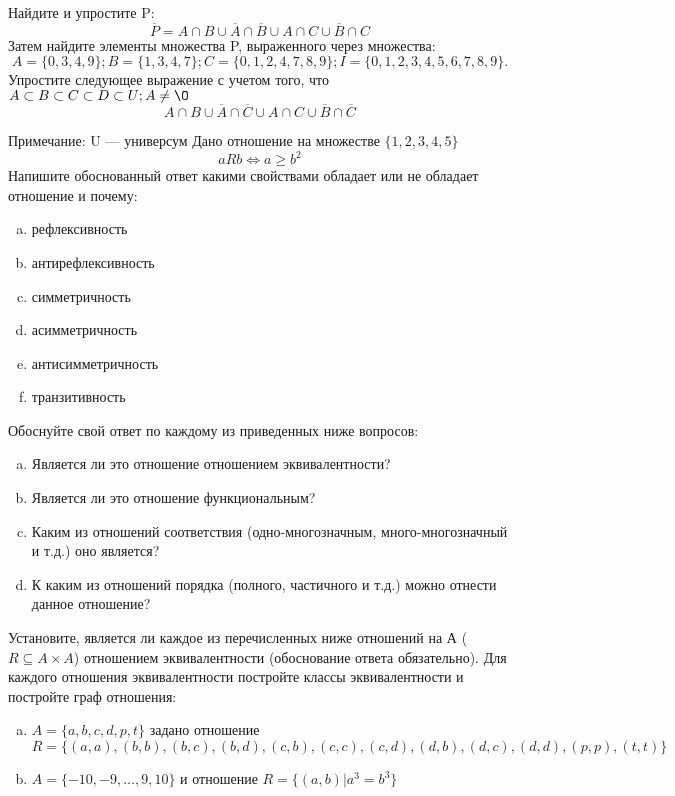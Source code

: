 \documentclass[10pt]{exam}
\begin{document}
\begin{questions}
\question
Найдите и упростите P:
\begin{equation*}
\overline{P} = A \cap B \cup \overline{A} \cap \overline{B} \cup A \cap C \cup \overline{B} \cap C
\end{equation*}
Затем найдите элементы множества P, выраженного через множества:
\begin{equation*}
A = \{0, 3, 4, 9\}; 
B = \{1, 3, 4, 7\};
C = \{0, 1, 2, 4, 7, 8, 9\};
I = \{0, 1, 2, 3, 4, 5, 6, 7, 8, 9\}.
\end{equation*}\question
Упростите следующее выражение с учетом того, что $A\subset B \subset C \subset D \subset U; A \neq \O$
\begin{equation*}
A \cap B \cup \overline{A} \cap \overline{C} \cup A \cap C \cup \overline{B} \cap \overline{C}
\end{equation*}

Примечание: U — универсум\question
Дано отношение на множестве $\{1, 2, 3, 4, 5\}$ 
\begin{equation*}
aRb \iff a \geq b^2
\end{equation*}
Напишите обоснованный ответ какими свойствами обладает или не обладает отношение и почему:   
\begin{enumerate} [a)]\setcounter{enumi}{0}
\item рефлексивность
\item антирефлексивность
\item симметричность
\item асимметричность
\item антисимметричность
\item транзитивность
\end{enumerate}

Обоснуйте свой ответ по каждому из приведенных ниже вопросов:
\begin{enumerate} [a)]\setcounter{enumi}{0}
    \item Является ли это отношение отношением эквивалентности?
    \item Является ли это отношение функциональным?
    \item Каким из отношений соответствия (одно-многозначным, много-многозначный и т.д.) оно является?
    \item К каким из отношений порядка (полного, частичного и т.д.) можно отнести данное отношение?
\end{enumerate}


\question
Установите, является ли каждое из перечисленных ниже отношений на А ($R \subseteq A \times A$) отношением эквивалентности (обоснование ответа обязательно). Для каждого отношения эквивалентности постройте классы 
эквивалентности и постройте граф отношения:
\begin{enumerate} [a)]\setcounter{enumi}{0}
\item $A = \{a, b, c, d, p, t\}$ задано отношение $R = \{(a, a), (b, b), (b, c), (b, d), (c, b), (c, c), (c, d), (d, b), (d, c), (d, d), (p,p), (t,t)\}$
\item $A = \{-10, -9, … , 9, 10\}$ и отношение $R = \{(a,b)|a^{3} = b^{3}\}$


\end{enumerate}
\end{questions}
\end{document}
